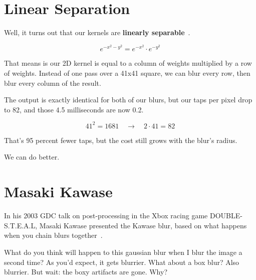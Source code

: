 \documentclass{article}
\begin{document}
\section{Linear Separation}

Well, it turns out that our kernels are \textbf{linearly separable}~\cite{web:wikipedia-gaussian-blur}.

\[
    e^{-x^2 - y^2} = e^{-x^2} \cdot e^{-y^2}
\]

That means is our 2D kernel is equal to a column of weights multiplied by a row of weights. Instead of one pass over a 41x41 square, we can blur every row, then blur every column of the result.

The output is exactly identical for both of our blurs, but our taps per pixel drop to 82, and those 4.5 milliseconds are now 0.2.

\[
    41^2 = 1681 \quad\longrightarrow\quad 2 \cdot 41 = 82
\]

That's 95 percent fewer taps, but the cost still grows with the blur's radius.

We can do better.

\section{Masaki Kawase}

In his 2003 GDC talk on post-processing in the Xbox racing game DOUBLE-S.T.E.A.L, Masaki Kawase presented the Kawase blur, based on what happens when you chain blurs together~\cite{kawase:gdc2003,video:doublesteal-gameplay}.

What do you think will happen to this gaussian blur when I blur the image a second time? As you'd expect, it gets blurrier. What about a box blur? Also blurrier. But wait: the boxy artifacts are gone. Why?
\end{document}
